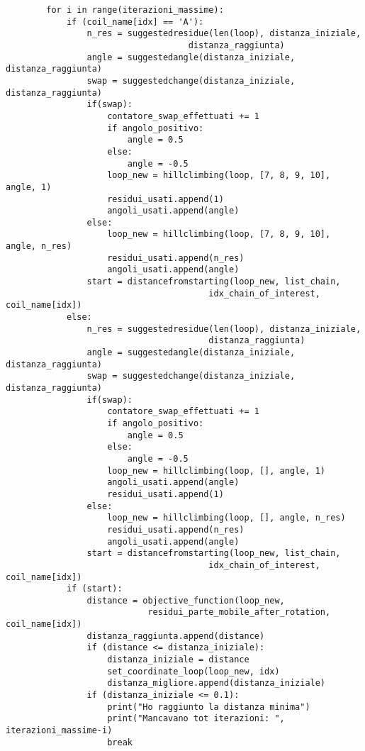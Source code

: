 \begin{verbatim}
        for i in range(iterazioni_massime):
            if (coil_name[idx] == 'A'):
                n_res = suggestedresidue(len(loop), distanza_iniziale, 
                                    distanza_raggiunta)
                angle = suggestedangle(distanza_iniziale, distanza_raggiunta)
                swap = suggestedchange(distanza_iniziale, distanza_raggiunta)
                if(swap):
                    contatore_swap_effettuati += 1
                    if angolo_positivo:
                        angle = 0.5
                    else:
                        angle = -0.5
                    loop_new = hillclimbing(loop, [7, 8, 9, 10], angle, 1)
                    residui_usati.append(1)
                    angoli_usati.append(angle)
                else:
                    loop_new = hillclimbing(loop, [7, 8, 9, 10], angle, n_res)
                    residui_usati.append(n_res)
                    angoli_usati.append(angle)
                start = distancefromstarting(loop_new, list_chain, 
                                        idx_chain_of_interest, coil_name[idx])
            else:
                n_res = suggestedresidue(len(loop), distanza_iniziale, 
                                        distanza_raggiunta)
                angle = suggestedangle(distanza_iniziale, distanza_raggiunta)
                swap = suggestedchange(distanza_iniziale, distanza_raggiunta)
                if(swap):
                    contatore_swap_effettuati += 1
                    if angolo_positivo:
                        angle = 0.5
                    else:
                        angle = -0.5
                    loop_new = hillclimbing(loop, [], angle, 1)
                    angoli_usati.append(angle)
                    residui_usati.append(1)
                else:
                    loop_new = hillclimbing(loop, [], angle, n_res)
                    residui_usati.append(n_res)
                    angoli_usati.append(angle)
                start = distancefromstarting(loop_new, list_chain, 
                                        idx_chain_of_interest, coil_name[idx])
            if (start):
                distance = objective_function(loop_new, 
                            residui_parte_mobile_after_rotation, coil_name[idx])
                distanza_raggiunta.append(distance)
                if (distance <= distanza_iniziale):
                    distanza_iniziale = distance
                    set_coordinate_loop(loop_new, idx)
                    distanza_migliore.append(distanza_iniziale)
                if (distanza_iniziale <= 0.1):
                    print("Ho raggiunto la distanza minima")
                    print("Mancavano tot iterazioni: ", iterazioni_massime-i)
                    break 
            

\end{verbatim}
